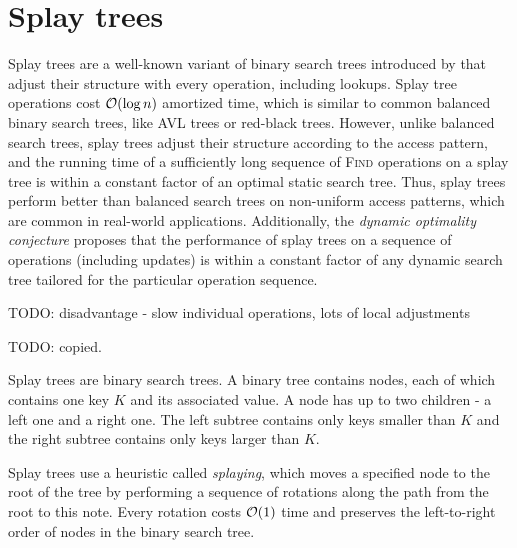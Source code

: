 \chapter{Splay trees}
\label{chapter:splay}
Splay trees are a well-known variant of binary search trees introduced
by \cite{splay} that adjust their structure with every operation, including
lookups. Splay tree operations cost $\mathcal{O}(\log n)$ amortized time, which is
similar to common balanced binary search trees, like AVL trees or
red-black trees.
However, unlike balanced search trees, splay trees adjust their structure
according to the access pattern, and the running time of a sufficiently long
sequence of \textsc{Find} operations on a splay tree is within a constant
factor of an optimal static search tree.
Thus, splay trees perform better than balanced search trees on non-uniform
access patterns, which are common in real-world applications.
Additionally, the \textit{dynamic optimality conjecture} proposes that
the performance of splay trees on a sequence of operations (including updates)
is within a constant factor of any dynamic search tree tailored for
the particular operation sequence.

TODO: disadvantage - slow individual operations, lots of local adjustments

TODO: copied.

Splay trees are binary search trees. A binary tree contains nodes, each of which
contains one key $K$ and its associated value.
A node has up to two children - a left one and a right one.
The left subtree contains only keys smaller than $K$ and the right subtree
contains only keys larger than $K$.


Splay trees use a heuristic called \textit{splaying}, which moves a specified
node to the root of the tree by performing a sequence of rotations along the
path from the root to this note. Every rotation costs $\mathcal{O}(1)$ time and preserves
the left-to-right order of nodes in the binary search tree.


